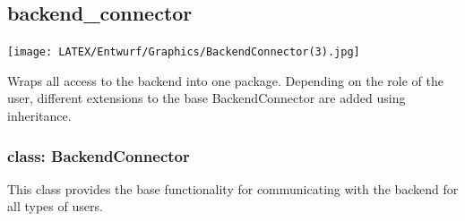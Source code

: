 \documentclass[oneside, ngerman]{sdqtechreport}
\begin{document}
\subsection{backend\_connector}
\begin{center}
\texttt{[image: LATEX/Entwurf/Graphics/BackendConnector(3).jpg]}
\end{center}
Wraps all access to the backend into one package. Depending on the role of the user, different extensions to the base BackendConnector are added using inheritance. 



 \subsubsection{class: BackendConnector}
 This class provides the base functionality for communicating with the backend for all types of users.
\end{document}
